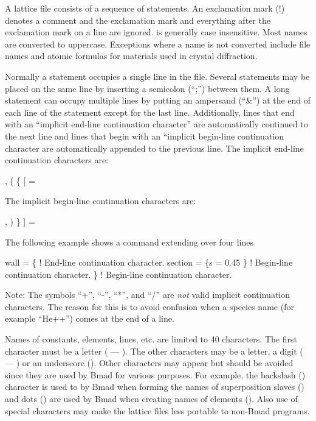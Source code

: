 A \bmad lattice file consists of a sequence of statements. An exclamation mark (!) denotes a comment
and the exclamation mark and everything after the exclamation mark on a line are ignored.  \bmad is
generally case insensitive. Most names are converted to uppercase. Exceptions where a name is not
converted include file names and atomic formulas for materials used in crystal diffraction.

Normally a statement occupies a single line in the file. Several statements may be placed on the
same line by inserting a semicolon (``;'') between them. A long statement can occupy multiple lines
by putting an ampersand (``\&'') at the end of each line of the statement except for the last
line. Additionally, lines that end with an ``implicit end-line continuation character'' are automatically
continued to the next line and lines that begin with an ``implicit begin-line continuation character are
automatically appended to the previous line. The implicit end-line continuation characters are:
\begin{example}
  ,   (   \{   [   =
\end{example}
The implicit begin-line continuation characters are:
\begin{example}
  ,   )   \}   ]   =
\end{example}
The following example shows a command extending over four lines
\begin{example}
  wall = \{               ! End-line continuation character.
    section = \{s = 0.45 
    \}                    ! Begin-line continuation character.
  \}                      ! Begin-line continuation character.
\end{example}
Note: The symbols ``+'', ``-'', ``*'', and ``/'' are {\em not} valid implicit continuation
characters. The reason for this is to avoid confusion when a species name (for example ``He++'')
comes at the end of a line.

Names of constants, elements, lines, etc. are limited to 40
characters. The first character must be a letter ( --- ).
The other characters may be a letter, a digit ( --- ) or
an underscore (\vn{_}). Other characters may appear but should be avoided
since they are used by Bmad for various purposes. For example, the 
backslash (\vn{\B}) character is used to by Bmad when forming the names of
superposition slaves () and dots () are used by Bmad 
when creating names of  elements (). Also use of
special characters may make the lattice files less portable to non-Bmad programs.

